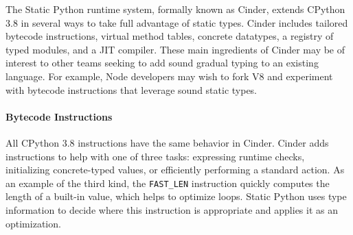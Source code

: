 \documentclass[english,cleveref,crc]{programming}
\newcommand{\SP}{Static Python}
\newcommand{\code}[1]{\texttt{#1}}
\begin{document}

The \SP{} runtime system, formally known as Cinder, extends
CPython 3.8 in several ways to take full advantage of static types.
Cinder includes tailored bytecode instructions, virtual method tables,
concrete datatypes, a registry of typed modules, and a JIT compiler.
These main ingredients of Cinder may be of interest to other teams seeking to
add sound gradual typing to an existing language.
For example, Node developers may wish to fork V8 and experiment with
bytecode instructions that leverage sound static types.


\paragraph{Bytecode Instructions}

All CPython 3.8 instructions have the same behavior in Cinder.
Cinder adds instructions to help with one of three tasks:
expressing runtime checks,
initializing concrete-typed values,
or efficiently performing a standard action.
As an example of the third kind, the \code{FAST\_LEN} instruction quickly
computes the length of a built-in value, which helps to optimize loops.
\SP{} uses type information to decide where this instruction is appropriate
and applies it as an optimization.

\end{document}
